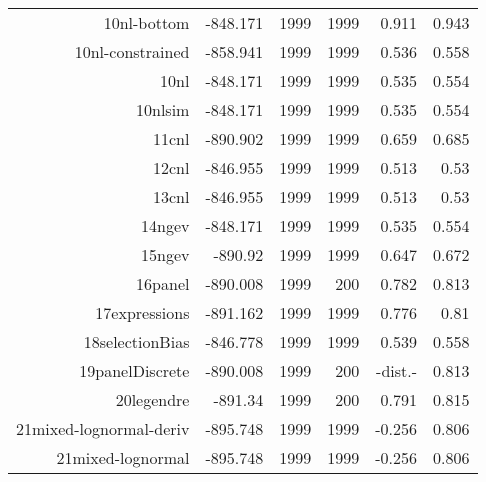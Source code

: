 \documentclass[12pt]{memoir}
\begin{document}
\begin{table}[htbf]
\begin{center}
\begin{tabular}{rrrrrr}
10nl-bottom &   -848.171 &       1999 &       1999 &      0.911 &      0.943 \\

10nl-constrained &   -858.941 &       1999 &       1999 &      0.536 &      0.558 \\

      10nl &   -848.171 &       1999 &       1999 &      0.535 &      0.554 \\

   10nlsim &   -848.171 &       1999 &       1999 &      0.535 &      0.554 \\

     11cnl &   -890.902 &       1999 &       1999 &      0.659 &      0.685 \\

     12cnl &   -846.955\footnotemark[2] &       1999 &       1999 &      0.513 &       0.53 \\

     13cnl &   -846.955 &       1999 &       1999 &      0.513 &       0.53 \\

    14ngev &   -848.171 &       1999 &       1999 &      0.535 &      0.554 \\

    15ngev &    -890.92 &       1999 &       1999 &      0.647 &      0.672 \\

   16panel &   -890.008\footnotemark[1] &       1999 &        200 &      0.782 &      0.813 \\

17expressions &   -891.162 &       1999 &       1999 &      0.776 &       0.81 \\

18selectionBias &   -846.778 &       1999 &       1999 &      0.539 &      0.558 \\

19panelDiscrete &   -890.008\footnotemark[1] &       1999 &        200 &    -dist.- &      0.813 \\

20legendre &    -891.34\footnotemark[1] &       1999 &        200 &      0.791 &      0.815 \\

21mixed-lognormal-deriv &   -895.748 &       1999 &       1999 &     -0.256 &      0.806 \\

21mixed-lognormal &   -895.748 &       1999 &       1999 &     -0.256 &      0.806 \\


\end{tabular}
\end{center}
\end{table}
\end{document}
